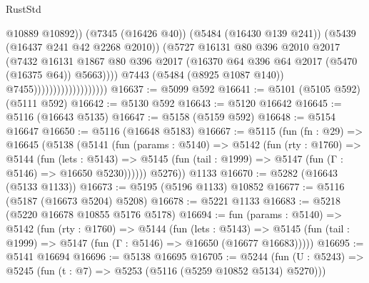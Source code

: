 \begin{lexlean}{RustStd}
\begin{coremodule}
{\begin{coremodule}
{{{{{{{{{{{{{{{{{{{{{{{{{{{{{{{                                                @10889
                                                @10892))
                                            (@7345 (@16426 @40))
                                            (@5484 (@16430 @139 @241))
                                            (@5439 (@16437 @241 @42 @2268 @2010))
                                            (@5727
                                              @16131
                                              @80
                                              @396
                                              @2010
                                              @2017
                                              (@7432
                                                @16131
                                                @1867
                                                @80
                                                @396
                                                @2017
                                                (@16370
                                                  @64
                                                  @396
                                                  @64
                                                  @2017
                                                  (@5470 (@16375 @64))
                                                  @5663))))
                                          @7443
                                          (@5484 (@8925 @1087 @140))
                                          @7455)))))))))))))))))))
@16637 := @5099 @592
@16641 := @5101 (@5105 @592) (@5111 @592)
@16642 := @5130 @592
@16643 := @5120 @16642
@16645 := @5116 (@16643 @5135)
@16647 := @5158 (@5159 @592)
@16648 := @5154 @16647
@16650 := @5116 (@16648 @5183)
@16667 := @5115
    (fun (fn : @29) =>
    @16645
      (@5138
        (@5141
          (fun (params : @5140) =>
          @5142
            (fun (rty : @1760) =>
            @5144
              (fun (lets : @5143) =>
              @5145 (fun (tail : @1999) => @5147 (fun (Γ : @5146) => @16650 @5230))))))
        @5276))
    @1133
@16670 := @5282 (@16643 (@5133 @1133))
@16673 := @5195 (@5196 @1133) @10852
@16677 := @5116 (@5187 (@16673 @5204) @5208)
@16678 := @5221 @1133
@16683 := @5218 (@5220 @16678 @10855 @5176 @5178)
@16694 := fun (params : @5140) =>
  @5142
    (fun (rty : @1760) =>
    @5144
      (fun (lets : @5143) =>
      @5145 (fun (tail : @1999) => @5147 (fun (Γ : @5146) => @16650 (@16677 @16683)))))
@16695 := @5141 @16694
@16696 := @5138 @16695
@16705 := @5244
    (fun (U : @5243) => @5245 (fun (t : @7) => @5253 (@5116 (@5259 @10852 @5134) @5270)))
}}}}}}}}}}}}}}}}}}}}}}}}}}}}}}}
\end{coremodule}}
\end{coremodule}
\end{lexlean}
